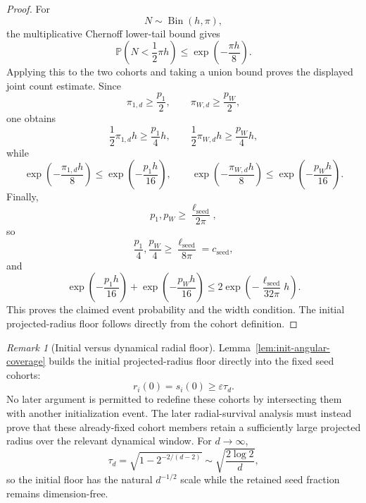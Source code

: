 \documentclass{article} %
\theoremstyle{plain}
\theoremstyle{definition}
\theoremstyle{remark}
\newtheorem{remark}[theorem]{Remark}
\begin{document}
\begin{proof}
For
\[
N\sim\operatorname{Bin}(h,\pi),
\]
the multiplicative Chernoff lower-tail bound gives
\[
\mathbb P
\left(
N<\frac12\pi h
\right)
\le
\exp\left(-\frac{\pi h}{8}\right).
\]
Applying this to the two cohorts and taking a union bound proves the displayed
joint count estimate. Since
\[
\pi_{1,d}\ge\frac{p_1}{2},
\qquad
\pi_{W,d}\ge\frac{p_W}{2},
\]
one obtains
\[
\frac12\pi_{1,d}h
\ge
\frac{p_1}{4}h,
\qquad
\frac12\pi_{W,d}h
\ge
\frac{p_W}{4}h,
\]
while
\[
\exp\left(-\frac{\pi_{1,d}h}{8}\right)
\le
\exp\left(-\frac{p_1h}{16}\right),
\qquad
\exp\left(-\frac{\pi_{W,d}h}{8}\right)
\le
\exp\left(-\frac{p_Wh}{16}\right).
\]
Finally,
\[
p_1,p_W
\ge
\frac{\ell_{\mathrm{seed}}}{2\pi},
\]
so
\[
\frac{p_1}{4},
\frac{p_W}{4}
\ge
\frac{\ell_{\mathrm{seed}}}{8\pi}
=
c_{\mathrm{seed}},
\]
and
\[
\exp\left(-\frac{p_1h}{16}\right)
+
\exp\left(-\frac{p_Wh}{16}\right)
\le
2\exp
\left(
-\frac{\ell_{\mathrm{seed}}}{32\pi}h
\right).
\]
This proves the claimed event probability and the width condition. The
initial projected-radius floor follows directly from the cohort definition.
\end{proof}

\begin{remark}[Initial versus dynamical radial floor]
\label{rem:init-vs-dynamic-radius}
Lemma~\ref{lem:init-angular-coverage} builds the initial projected-radius
floor directly into the fixed seed cohorts:
\[
r_i(0)
=
s_i(0)
\ge
\varepsilon\tau_d.
\]
No later argument is permitted to redefine these cohorts by intersecting
them with another initialization event. The later radial-survival analysis
must instead prove that these already-fixed cohort members retain a
sufficiently large projected radius over the relevant dynamical window.
For $d\to\infty$,
\[
\tau_d
=
\sqrt{1-2^{-2/(d-2)}}
\sim
\sqrt{\frac{2\log2}{d}},
\]
so the initial floor has the natural $d^{-1/2}$ scale while the retained seed
fraction remains dimension-free.
\end{remark}
\end{document}
